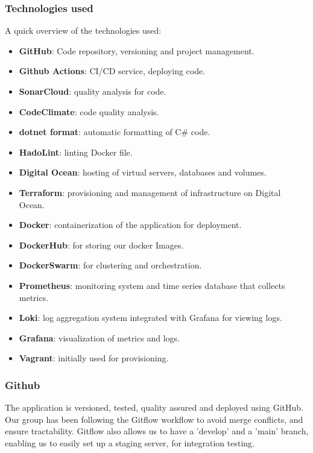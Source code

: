 \subsubsection{Technologies used}
A quick overview of the technologies used:
\begin{itemize}
    \item \textbf{GitHub}: Code repository, versioning and project management.
    \item \textbf{Github Actions}: CI/CD service, deploying code. 
    \item \textbf{SonarCloud}: quality analysis for code.
    \item \textbf{CodeClimate}: code quality analysis.
    \item \textbf{dotnet format}: automatic formatting of C\# code.
    \item \textbf{HadoLint}: linting Docker file.
    \item \textbf{Digital Ocean}: hosting of virtual servers, databases and volumes.
    \item \textbf{Terraform}: provisioning and management of infrastructure on Digital Ocean.
    \item \textbf{Docker}: containerization of the application for deployment.
    \item \textbf{DockerHub}: for storing our docker Images. 
    \item \textbf{DockerSwarm}: for clustering and orchestration. 
    \item \textbf{Prometheus}: monitoring system and time series database that collects metrics.
    \item \textbf{Loki}: log aggregation system integrated with Grafana for viewing logs.
    \item \textbf{Grafana}: visualization of metrics and logs.
    \item \textbf{Vagrant}: initially used for provisioning. 
\end{itemize} 

\newpage

\subsubsection{Github}
The application is versioned, tested, quality assured and deployed using GitHub. Our group has been following the Gitflow workflow to avoid merge conflicts, and ensure tractability. Gitflow also allows us to have a 'develop' and a 'main' branch, enabling us to easily set up a staging server, for integration testing.

